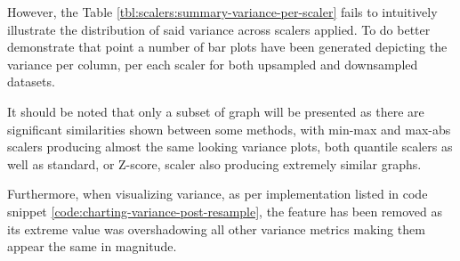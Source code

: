However, the Table \ref{tbl:scalers:summary-variance-per-scaler} fails to intuitively illustrate the distribution of said variance across scalers applied. To do better demonstrate that point a number of bar plots have been generated depicting the variance per column, per each scaler for both upsampled and downsampled datasets. 

It should be noted that only a subset of graph will be presented as there are significant similarities shown between some methods, with min-max and max-abs scalers producing almost the same looking variance plots, both quantile scalers as well as standard, or Z-score, scaler also producing extremely similar graphs.

Furthermore, when visualizing variance, as per implementation listed in code snippet \ref{code:charting-variance-post-resample}, the \fileAgeInSec{} feature has been removed as its extreme value was overshadowing all other variance metrics making them appear the same in magnitude. 

